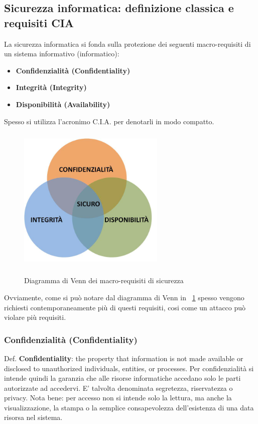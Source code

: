 \subsection{Sicurezza informatica: definizione classica e requisiti CIA}
La sicurezza informatica si fonda sulla protezione dei seguenti macro-requisiti di un sistema informativo (informatico):
\begin{itemize} 
  \item \textbf{Confidenzialità (Confidentiality)}
  \item \textbf{Integrità (Integrity)}
  \item \textbf{Disponibilità (Availability)}
\end{itemize}
Spesso si utilizza l’acronimo C.I.A. per denotarli in modo compatto.
\begin{figure}[htbp]
	\centering%
	\subfigure%
	{\includegraphics[height=7cm, width=7cm, keepaspectratio]{Immagini/Capitolo1/venn_security}}
	\caption{Diagramma di Venn dei macro-requisiti di sicurezza \label{fig:venn_security}} 	
\end{figure}
Ovviamente, come si può notare dal diagramma di Venn in \figurename ~\ref{fig:venn_security} spesso vengono richiesti contemporaneamente più di questi requisiti, cosi come un attacco può violare più requisiti.

\subsubsection{Confidenzialità (Confidentiality)}
Def. \textbf{Confidentiality}: the property that information is not made available or disclosed to unauthorized individuals, entities, or processes. Per confidenzialità si intende quindi la garanzia che alle risorse informatiche accedano solo le parti autorizzate ad accedervi. E' talvolta denominata segretezza, riservatezza o privacy. Nota bene: per accesso non si intende solo la lettura, ma anche la visualizzazione, la stampa o la semplice consapevolezza dell’esistenza di una data risorsa nel sistema.\newline

